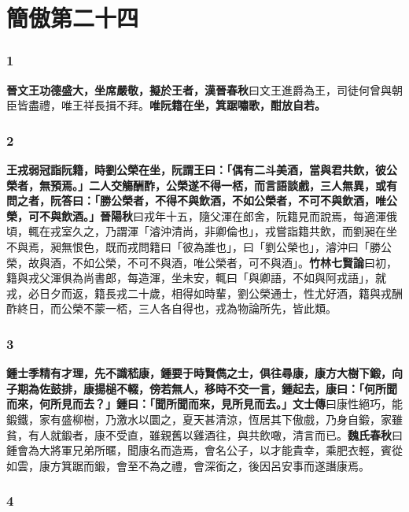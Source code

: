 \chapter{簡傲第二十四}

\subsection*{1}

\textbf{晉文王功德盛大，坐席嚴敬，擬於王者，}{\footnotesize \textbf{漢晉春秋}曰文王進爵為王，司徒何曾與朝臣皆盡禮，唯王祥長揖不拜。}\textbf{唯阮籍在坐，箕踞嘯歌，酣放自若。}

\subsection*{2}

\textbf{王戎弱冠詣阮籍，時劉公榮在坐，阮謂王曰：「偶有二斗美酒，當與君共飲，彼公榮者，無預焉。」二人交觴酬酢，公榮遂不得一桮，而言語談戲，三人無異，或有問之者，阮答曰：「勝公榮者，不得不與飲酒，不如公榮者，不可不與飲酒，唯公榮，可不與飲酒。」}{\footnotesize \textbf{晉陽秋}曰戎年十五，隨父渾在郎舍，阮籍見而說焉，每適渾俄頃，輒在戎室久之，乃謂渾「濬沖清尚，非卿倫也」，戎嘗詣籍共飲，而劉昶在坐不與焉，昶無恨色，既而戎問籍曰「彼為誰也」，曰「劉公榮也」，濬沖曰「勝公榮，故與酒，不如公榮，不可不與酒，唯公榮者，可不與酒」。\textbf{竹林七賢論}曰初，籍與戎父渾俱為尚書郎，每造渾，坐未安，輒曰「與卿語，不如與阿戎語」，就戎，必日夕而返，籍長戎二十歲，相得如時輩，劉公榮通士，性尤好酒，籍與戎酬酢終日，而公榮不蒙一桮，三人各自得也，戎為物論所先，皆此類。}

\subsection*{3}

\textbf{鍾士季精有才理，先不識嵇康，鍾要于時賢儁之士，俱往尋康，康方大樹下鍛，向子期為佐鼓排，康揚槌不輟，傍若無人，移時不交一言，鍾起去，康曰：「何所聞而來，何所見而去？」鍾曰：「聞所聞而來，見所見而去。」}{\footnotesize \textbf{文士傳}曰康性絕巧，能鍛鐵，家有盛柳樹，乃激水以圜之，夏天甚清涼，恆居其下傲戲，乃身自鍛，家雖貧，有人就鍛者，康不受直，雖親舊以雞酒往，與共飲噉，清言而已。\textbf{魏氏春秋}曰鍾會為大將軍兄弟所暱，聞康名而造焉，會名公子，以才能貴幸，乘肥衣輕，賓從如雲，康方箕踞而鍛，會至不為之禮，會深銜之，後因呂安事而遂譖康焉。}

\subsection*{4}

